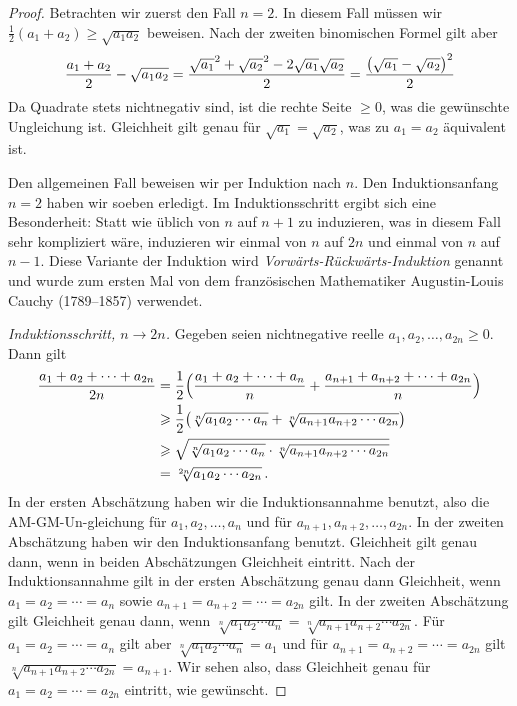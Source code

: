 \begin{proof}
	Betrachten wir zuerst den Fall $n=2$. In diesem Fall müssen wir $\frac12(a_1+a_2)\geqslant \sqrt{a_1a_2}$ beweisen. Nach der zweiten binomischen Formel gilt aber
	\begin{equation*}
		\frac{a_1+a_2}2-\sqrt{a_1a_2}=\frac{\sqrt{a_1}^2+\sqrt{a_2}^2-2\sqrt{a_1} \sqrt{a_2}}2=\frac{\parens*{\sqrt{a_1}-\sqrt{a_2}}^2}{2}
	\end{equation*}
	Da Quadrate stets nichtnegativ sind, ist die rechte Seite $\geqslant 0$, was die gewünschte Ungleichung ist. Gleichheit gilt genau für $\sqrt{a_1}=\sqrt{a_2}$, was zu $a_1=a_2$ äquivalent ist.
	
	Den allgemeinen Fall beweisen wir per Induktion nach $n$. Den Induktionsanfang $n=2$ haben wir soeben erledigt. Im Induktionsschritt ergibt sich eine Besonderheit: Statt wie üblich von $n$ auf $n+1$ zu induzieren, was in diesem Fall sehr kompliziert wäre, induzieren wir einmal von $n$ auf $2n$ und einmal von $n$ auf $n-1$. Diese Variante der Induktion wird \emph{Vorwärts-Rückwärts-Induktion} genannt und wurde zum ersten Mal von dem französischen Mathematiker Augustin-Louis Cauchy (1789--1857) verwendet.
	
	\emph{Induktionsschritt, $n\rightarrow 2n$.} Gegeben seien nichtnegative reelle $a_1,a_2,\dotsc,a_{2n}\geqslant 0$. Dann gilt
	\begin{align*}
		\frac{a_1+a_2+\dotsb+a_{2n}}{2n}&=\frac12\parens*{\frac{a_1+a_2+\dotsb+a_n}{n}+\frac{a_{n+1}+a_{n+2}+\dotsb+a_{2n}}{n}}\\
		&\geqslant \frac12\parens[\big]{\sqrt[n]{a_1a_2\dotsm a_n}+\sqrt[n]{a_{n+1}a_{n+2}\dotsm a_{2n}}}\\
		&\geqslant \sqrt{\sqrt[n]{a_1a_2\dotsm a_n}\cdot \sqrt[n]{a_{n+1}a_{n+2}\dotsm a_{2n}}}\\
		&=\sqrt[2n]{a_1a_2\dotsm a_{2n}}\,.
	\end{align*}
	In der ersten Abschätzung haben wir die Induktionsannahme benutzt, also die AM-GM-Un-gleichung für $a_1,a_2,\dotsc,a_n$ und für $a_{n+1},a_{n+2},\dotsc,a_{2n}$. In der zweiten Abschätzung haben wir den Induktionsanfang benutzt. Gleichheit gilt genau dann, wenn in beiden Abschätzungen Gleichheit eintritt. Nach der Induktionsannahme gilt in der ersten Abschätzung genau dann Gleichheit, wenn $a_1=a_2=\dotsb=a_n$ sowie $a_{n+1}=a_{n+2}=\dotsb=a_{2n}$ gilt. In der zweiten Abschätzung gilt Gleichheit genau dann, wenn $\sqrt[n]{a_1a_2\dotsm a_n}=\sqrt[n]{a_{n+1}a_{n+2}\dotsm a_{2n}}$. Für $a_1=a_2=\dotsb=a_n$ gilt aber $\sqrt[n]{a_1a_2\dotsm a_n}=a_1$ und für $a_{n+1}=a_{n+2}=\dotsb=a_{2n}$ gilt $\sqrt[n]{a_{n+1}a_{n+2}\dotsm a_{2n}}=a_{n+1}$. Wir sehen also, dass Gleichheit genau für $a_1=a_2=\dotsb=a_{2n}$ eintritt, wie gewünscht.
	

\end{proof}
